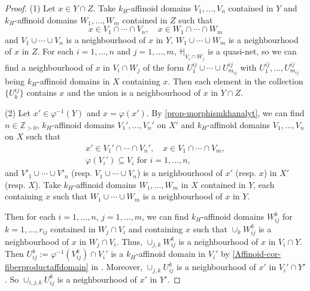 \begin{proof}
    (1) Let $x\in Y\cap Z$. Take $k_H$-affinoid domains $V_1,\ldots,V_n$ contained in $Y$ and $k_H$-affinoid domains $W_1,\ldots,W_m$ contained in $Z$ such that
    \[
        x\in V_1\cap \cdots\cap V_n,\quad x\in W_1\cap \cdots \cap W_m
    \]
    and $V_1\cup\cdots\cup V_n$ is a neighbourhood of $x$ in $Y$, $W_1\cup\cdots\cup W_m$ is a neighbourhood of $x$ in $Z$. For each $i=1,\ldots,n$ and $j=1,\ldots,m$, $\hat{\tau}|_{V_i\cap W_j}$ is a quasi-net, so we can find a neighbourhood of $x$ in $V_{i}\cap W_j$ of the form $U^{ij}_1\cup \cdots\cup U^{ij}_{m_{ij}}$ with $U^{ij}_1,\ldots,U^{ij}_{m_{ij}}$ being $k_H$-affinoid domains in $X$ containing $x$. Then each element in the collection $\{U^{ij}_k\}$ contains $x$ and the union is a neighbourhood of $x$ in $Y\cap Z$.

    (2) Let $x'\in \varphi^{-1}(Y)$ and $x=\varphi(x')$.
    By \cref{prop-morphismkhanalyt}, we can find $n\in \mathbb{Z}_{>0}$, $k_H$-affinoid domains $V_1',\ldots,V_n'$ on $X'$ and $k_H$-affinoid domains $V_1,\ldots,V_n$ on $X$ such that 
    \[
        \begin{aligned}
        x'\in V_1'\cap \cdots\cap V_n',\quad x\in V_1\cap \cdots\cap V_m,  \\
        \varphi(V_i')\subseteq V_i\text{ for }i=1,\ldots,n,
        \end{aligned}
    \]
    and $V'_1\cup\cdots\cup V'_n$ (resp. $V_1\cup\cdots\cup V_n$) is a neighbourhood of $x'$ (resp. $x$) in $X'$ (resp. $X$). 
    Take $k_H$-affinoid domains $W_1,\ldots,W_m$ in $X$ contained in $Y$, each containing $x$ such that $W_1\cup\cdots\cup W_m$ is a neighbourhood of $x$ in $Y$. 
    
    Then for each $i=1,\ldots,n$, $j=1,\ldots,m$, we can find $k_H$-affinoid domains $W_{ij}^k$ for $k=1,\ldots,r_{ij}$ contained in $W_j\cap V_i$ and  containing $x$ such that $\cup_k W_{ij}^k$ is a neighbourhood of $x$ in $W_j\cap V_i$. Thus, $\cup_{j,k} W_{ij}^k$ is a neighbourhood of $x$ in $V_i\cap Y$.
    Then $U_{ij}^k:=\varphi^{-1}(V_{ij}^k)\cap V_{i}'$ is a $k_H$-affinoid domain in $V_i'$ by \cref{Affinoid-cor-fiberproductaffdomain} in . Moreover, $\cup_{j,k} U_{ij}^k$ is a neighbourhood of $x'$ in $V_i'\cap Y'$. So $\cup_{i,j,k} U_{ij}^k$ is a neighbourhood of $x'$ in $Y'$.
\end{proof}

